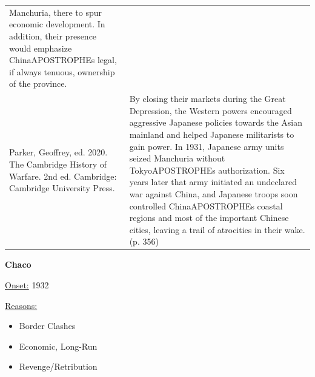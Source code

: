 {\begin{longtable}{p{}p{}}
Manchuria, there to spur economic development. In addition, their presence would emphasize ChinaAPOSTROPHEs legal, if always tenuous, ownership of the province.
\\
Parker, Geoffrey, ed. 2020. The Cambridge History of Warfare. 2nd ed. Cambridge: Cambridge University Press. & By closing their markets during the Great Depression, the Western powers encouraged aggressive Japanese policies towards the Asian mainland and helped Japanese militarists to gain power. In 1931, Japanese army units seized Manchuria without TokyoAPOSTROPHEs authorization. Six years later that army initiated an undeclared war against China, and Japanese troops soon controlled ChinaAPOSTROPHEs coastal regions and most of the important Chinese cities, leaving a trail of atrocities in their wake.  (p. 356)
\\
\end{longtable}}
\clearpage
         \textbf{Chaco} 

          \underline{Onset:} 1932         

\underline{Reasons:}
\begin{itemize}
\item Border Clashes
\item Economic, Long-Run
\item Revenge/Retribution
\end{itemize}

